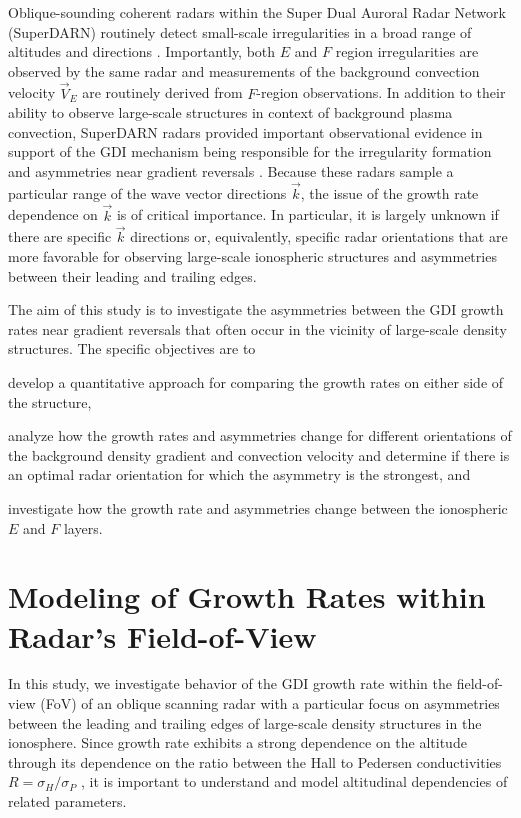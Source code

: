 Oblique-sounding coherent radars within the Super Dual Auroral Radar Network (SuperDARN) routinely detect small-scale irregularities in a broad range of altitudes and directions \citep{Chisham2007}. Importantly, both \(E\) and \(F\) region irregularities are observed by the same radar \citep[e.g. recent papers by][]{Lamarche2015,Forsythe2015} and measurements of the background convection velocity \(\vec{V}_E\) are routinely derived from \(F\)-region observations. In addition to their ability to observe large-scale structures in context of background plasma convection, SuperDARN radars provided important observational evidence in support of the GDI mechanism being responsible for the irregularity formation and asymmetries near gradient reversals \citep{Milan2002a,Koustov2012}. Because these radars sample a particular range of the wave vector directions \(\vec{k}\), the issue of the growth rate dependence on \(\vec{k}\) is of critical importance. In particular, it is largely unknown if there are specific \(\vec{k}\) directions or, equivalently, specific radar orientations that are more favorable for observing large-scale ionospheric structures and asymmetries between their leading and trailing edges.



The aim of this study is to investigate the asymmetries between the GDI growth rates near gradient reversals that often occur in the vicinity of large-scale density structures. The specific objectives are to 
\begin{enumerate*}[label={(\arabic*)}]
	\item develop a quantitative approach for comparing the growth rates on either side of the structure,
	\item analyze how the growth rates and asymmetries change for different orientations of the background density gradient and convection velocity and determine if there is an optimal radar orientation for which the asymmetry is the strongest, and
	\item investigate how the growth rate and asymmetries change between the ionospheric \(E\) and \(F\) layers.
\end{enumerate*}


\section{Modeling of Growth Rates within Radar's Field-of-View}
\label{sec:model_fov}
In this study, we investigate behavior of the GDI growth rate within the field-of-view (FoV) of an oblique scanning radar with a particular focus on asymmetries between the leading and trailing edges of large-scale density structures in the ionosphere. Since growth rate exhibits a strong dependence on the altitude through its dependence on the ratio between the Hall to Pedersen conductivities \(R=\sigma_H/\sigma_P\) \citep{Makarevich2014c}, it is important to understand and model altitudinal dependencies of related parameters.

